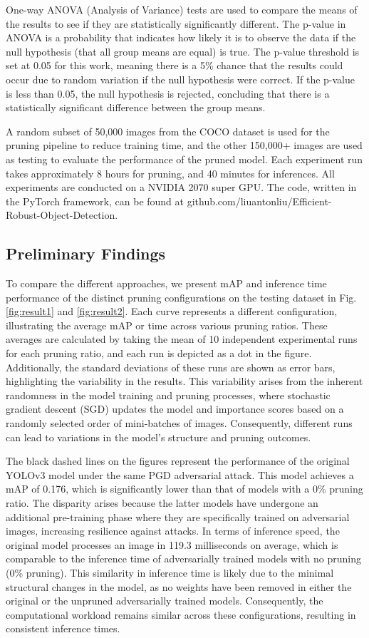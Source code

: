 \documentclass[journal,onecolumn,12pt]{IEEEtran}
\begin{document}
One-way ANOVA (Analysis of Variance) tests are used to compare the means of the results to see if they are statistically significantly different. The p-value in ANOVA is a probability that indicates how likely it is to observe the data if the null hypothesis (that all group means are equal) is true. The p-value threshold is set at 0.05 for this work, meaning there is a 5\% chance that the results could occur due to random variation if the null hypothesis were correct. If the p-value is less than 0.05, the null hypothesis is rejected, concluding that there is a statistically significant difference between the group means.

A random subset of 50,000 images from the COCO dataset is used for the pruning pipeline to reduce training time, and the other 150,000+ images are used as testing to evaluate the performance of the pruned model. Each experiment run takes approximately 8 hours for pruning, and 40 minutes for inferences. All experiments are conducted on a NVIDIA 2070 super GPU. The code, written in the PyTorch framework, can be found at github.com/liuantonliu/Efficient-Robust-Object-Detection.

\subsection{Preliminary Findings}
To compare the different approaches, we present mAP and inference time performance of the distinct pruning configurations on the testing dataset in Fig. \ref{fig:result1} and \ref{fig:result2}. Each curve represents a different configuration, illustrating the average mAP or time across various pruning ratios. These averages are calculated by taking the mean of 10 independent experimental runs for each pruning ratio, and each run is depicted as a dot in the figure. Additionally, the standard deviations of these runs are shown as error bars, highlighting the variability in the results. This variability arises from the inherent randomness in the model training and pruning processes, where stochastic gradient descent (SGD) updates the model and importance scores based on a randomly selected order of mini-batches of images. Consequently, different runs can lead to variations in the model's structure and pruning outcomes. 

The black dashed lines on the figures represent the performance of the original YOLOv3 model under the same PGD adversarial attack. This model achieves a mAP of 0.176, which is significantly lower than that of models with a 0\% pruning ratio. The disparity arises because the latter models have undergone an additional pre-training phase where they are specifically trained on adversarial images, increasing resilience against attacks. In terms of inference speed, the original model processes an image in 119.3 milliseconds on average, which is comparable to the inference time of adversarially trained models with no pruning (0\% pruning). This similarity in inference time is likely due to the minimal structural changes in the model, as no weights have been removed in either the original or the unpruned adversarially trained models. Consequently, the computational workload remains similar across these configurations, resulting in consistent inference times.
\end{document}
